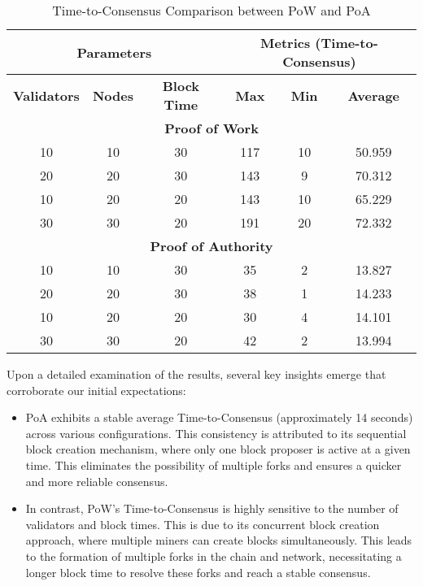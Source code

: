 \begin{table}[h]
\centering
\caption{Time-to-Consensus Comparison between PoW and PoA}
\label{table:time-to-consensus}
\begin{tabular}{|c|c|c||c|c|c|}
\hline
\multicolumn{3}{|c||}{\textbf{Parameters}} & \multicolumn{3}{c|}{\textbf{Metrics (Time-to-Consensus)}} \\
\hline
\textbf{Validators} & \textbf{Nodes} & \textbf{Block Time} & \textbf{Max} & \textbf{Min} & \textbf{Average} \\
\hline
\multicolumn{6}{|c|}{\textbf{Proof of Work}} \\
\hline
\rowcolor{Gray}
10 & 10 & 30 & 117 & 10 & 50.959 \\
\rowcolor{LightBlue}
20 & 20 & 30 & 143 & 9 & 70.312 \\
\rowcolor{LightYellow}
10 & 20 & 20 & 143 & 10 & 65.229 \\
\rowcolor{LightRed}
30 & 30 & 20 & 191 & 20 & 72.332 \\
\hline
\multicolumn{6}{|c|}{\textbf{Proof of Authority}} \\
\hline
\rowcolor{Gray}
10 & 10 & 30 & 35 & 2 & 13.827 \\
\rowcolor{LightBlue}
20 & 20 & 30 & 38 & 1 & 14.233 \\
\rowcolor{LightYellow}
10 & 20 & 20 & 30 & 4 & 14.101 \\
\rowcolor{LightRed}
30 & 30 & 20 & 42 & 2 & 13.994 \\
\hline
\end{tabular}
\end{table}



Upon a detailed examination of the results, several key insights emerge that corroborate our initial expectations:

\begin{itemize}
    \item PoA exhibits a stable average Time-to-Consensus (approximately 14 seconds) across various configurations. This consistency is attributed to its sequential block creation mechanism, where only one block proposer is active at a given time. This eliminates the possibility of multiple forks and ensures a quicker and more reliable consensus. 
    
    \item In contrast, PoW's Time-to-Consensus is highly sensitive to the number of validators and block times. This is due to its concurrent block creation approach, where multiple miners can create blocks simultaneously. This leads to the formation of multiple forks in the chain and network, necessitating a longer block time to resolve these forks and reach a stable consensus.
\end{itemize}

